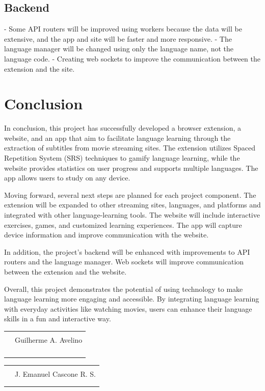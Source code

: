 \documentclass[12pt]{article}
\begin{document}
\subsection{Backend} 

- Some API routers will be improved using workers because the data will be extensive, and the app and site will be faster and more responsive.
- The language manager will be changed using only the language name, not the language code. 
- Creating web sockets to improve the communication between the extension and the site.

\section{Conclusion}

In conclusion, this project has successfully developed a browser extension, a website, and an app that aim to facilitate language learning through the extraction of subtitles from movie streaming sites. The extension utilizes Spaced Repetition System (SRS) techniques to gamify language learning, while the website provides statistics on user progress and supports multiple languages. The app allows users to study on any device.

Moving forward, several next steps are planned for each project component. The extension will be expanded to other streaming sites, languages, and platforms and integrated with other language-learning tools. The website will include interactive exercises, games, and customized learning experiences. The app will capture device information and improve communication with the website.

In addition, the project's backend will be enhanced with improvements to API routers and the language manager. Web sockets will improve communication between the extension and the website.

Overall, this project demonstrates the potential of using technology to make language learning more engaging and accessible. By integrating language learning with everyday activities like watching movies, users can enhance their language skills in a fun and interactive way.




\centering
\break

\begin{tabular}{@{}p{.5in}p{4in}@{}}
& \hrulefill \\
& \centerline{Guilherme A. Avelino} \\
\\ \\ \\ \\ 
\end{tabular}

\centering
\begin{tabular}{@{}p{.5in}p{4in}@{}}
& \hrulefill \\
& \centerline{J. Emanuel Cascone R. S.} \\
\\ \\
\end{tabular}
\end{document}
